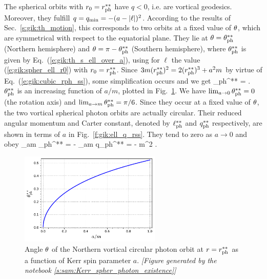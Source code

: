 The spherical orbits with $r_0 = r_{\rm ph}^{**}$ have
$q < 0$, i.e. are vortical geodesics. Moreover, they fulfill $q=q_{\rm min}=-(a - |\ell|)^2$.
According to the results of Sec.~\ref{s:gik:th_motion}, this corresponds to two orbits at
a fixed value of $\theta$, which are symmetrical with respect to the equatorial plane.
They lie at $\theta = \theta_{\rm ph}^{**}$ (Northern hemisphere) and
$\theta = \pi - \theta_{\rm ph}^{**}$ (Southern hemisphere), where
$\theta_{\rm ph}^{**}$ is given by Eq.~(\ref{e:gik:th_s_ell_over_a}), using
for $\ell$ the value (\ref{e:gik:spher_ell_r0}) with $r_0 = r_{\rm ph}^{**}$.
Since $3 m (r_{\rm ph}^{**})^2 = 2 (r_{\rm ph}^{**})^3 + a^2 m$ by virtue of
Eq.~(\ref{e:gik:cubic_rph_ss}), some simplification occurs and we get
\be
    \th_{\rm ph}^{**} =  \arcsin{} .
\ee
$\theta_{\rm ph}^{**}$ is an increasing function of $a/m$, plotted in Fig.~\ref{f:gik:theta_ss}.
We have $\lim_{a\to 0} \theta_{\rm ph}^{**} = 0$ (the rotation axis) and
$\lim_{a\to m} \theta_{\rm ph}^{**} = \pi/6$.
Since they occur at a fixed value of $\theta$, the two vortical spherical photon orbits
are actually circular. Their reduced angular momentum and Carter constant,
denoted by $\ell_{\rm ph}^{**}$ and
$q_{\rm ph}^{**}$ respectively,
are shown in terms of $a$ in Fig.~\ref{f:gik:ell_q_rss}.
They tend to zero as $a\to 0$ and obey
\be
    \lim_{a\to m} \ell_{\rm ph}^{**} = -  \qand
    \lim_{a\to m} q_{\rm ph}^{**} = -  m^2 .
\ee

\begin{figure}
\centerline{\includegraphics[width=0.6\textwidth]{gik_theta_ss.pdf}}
\caption[]{\label{f:gik:theta_ss} \footnotesize
Angle $\theta$ of the Northern vortical circular photon orbit at $r = r_{\rm ph}^{**}$ as a
function of Kerr spin parameter $a$.
\textsl{[Figure generated by the notebook \ref{s:sam:Kerr_spher_photon_existence}]}
}
\end{figure}

